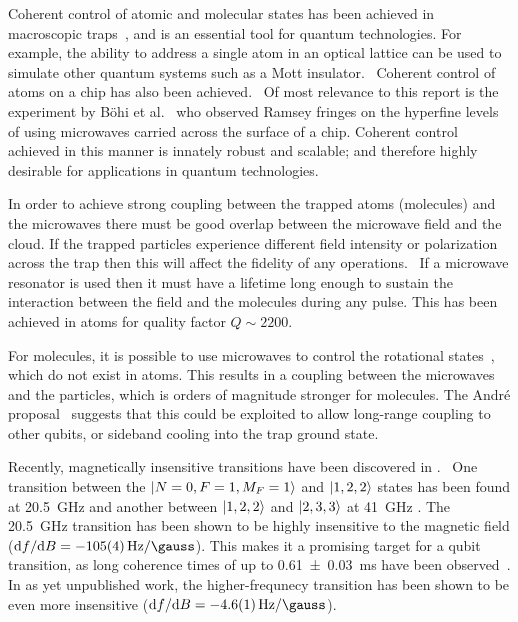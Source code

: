 %
Coherent control of atomic and molecular states has been achieved in macroscopic
traps~\cite{Gross995, Blackmore_2018}, and is an essential tool for quantum
technologies. For example, the ability to address a single atom in an optical
lattice can be used to simulate other quantum systems such as a Mott
insulator.~\cite{Weitenberg2011} Coherent control of atoms on a chip has also
been achieved.~\cite{PhysRevLett.92.063601} Of most relevance to this report is
the experiment by B\"ohi et al.~\cite{Boehi2009} who observed Ramsey fringes on
the hyperfine levels of \esRb{} using microwaves carried across the surface of a
chip. Coherent control achieved in this manner is innately robust and scalable;
and therefore highly desirable for applications in quantum technologies.

%
In order to achieve strong coupling between the trapped atoms (molecules) and the
microwaves there must be good overlap between the microwave field and the cloud.
If the trapped particles experience different field intensity or polarization
across the trap then this will affect the fidelity of any
operations.~\cite{Williams2018} If a microwave resonator is used then it must
have a lifetime long enough to sustain the interaction between the field and the
molecules during any pulse. This has been achieved in atoms for quality factor
$Q\sim2200$.~\cite{Hattermann2017}

%
For molecules, it is possible to use microwaves to control the rotational
states~\cite{Blackmore_2018}, which do not exist in atoms. This results in a
coupling between the microwaves and the particles, which is orders of magnitude
stronger for molecules. The Andr\'e proposal~\cite{Andre2006} suggests that this
could be exploited to allow long-range coupling to other qubits, or sideband
cooling into the trap ground state.

%
Recently, magnetically insensitive transitions have been discovered in
\CaF{}.~\cite{Williams2018, Blackmore_2018}  One transition between
the $\ket{N=0, F=1, M_F=1}$ and $\ket{1,2,2}$ states has been found at
\SI{20.5}{\giga\hertz} and another between $\ket{1,2,2}$ and $\ket{2,3,3}$ at
\SI{41}{\giga\hertz} . The \SI{20.5}{\giga\hertz} transition has been shown to
be highly insensitive to the magnetic field ($\dd f / \dd B =
-\SI{105(4)}{\hertz\per\gauss}$). This makes it a promising target for a qubit
transition, as long coherence times of up to \SI{0.61(3)}{\milli\second} have
been observed~\cite{Blackmore_2018}. In as yet unpublished work, the
higher-frequnecy transition has been shown to be even more insensitive ($\dd f /
\dd B = -\SI{4.6(1)}{\hertz\per\gauss}$). 

